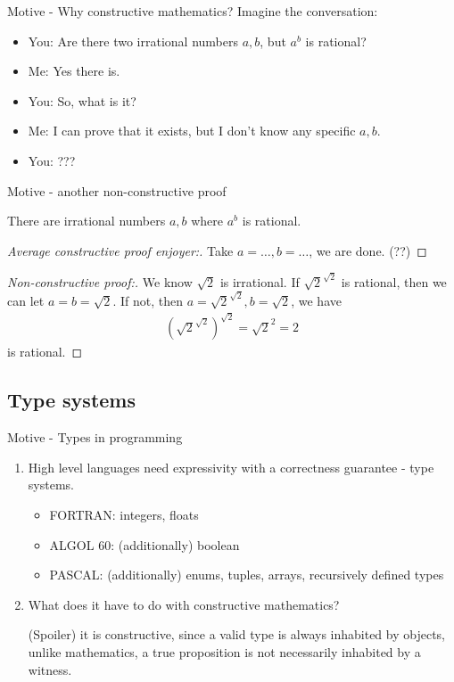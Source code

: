\documentclass{beamer}
\theoremstyle{plain}
\begin{document}
\begin{frame}{Motive - Why constructive mathematics?}
  Imagine the conversation:
  \begin{itemize}
    \pause
    \item You: Are there two irrational numbers $a, b$, but $a^{b}$ is rational?
    \pause
    \item Me: Yes there is.
    \pause
    \item You: So, what is it?
    \pause
    \item Me: I can prove that it exists, but I don't know any specific $a, b$.
    \pause
    \item You: ???
  \end{itemize}
\end{frame}

\begin{frame}{Motive - another non-constructive proof}
  \begin{theorem}
    There are irrational numbers $a,b$ where $a^{b}$ is rational.
  \end{theorem}
  \pause
  \begin{proof}[Average constructive proof enjoyer:]
    Take $a = \ldots, b = \ldots$, we are done. (??)
  \end{proof}
  \pause
  \begin{proof}[Non-constructive proof:]
    We know $\sqrt{2}$ is irrational. If $\sqrt{2}^{\sqrt{2}}$ is rational, then
    we can let $a=b=\sqrt{2}$. If not, then $a=\sqrt{2}^{\sqrt{2}}, b=\sqrt{2}$,
    we have
    \begin{align*}
      (\sqrt{2}^{\sqrt{2}})^{\sqrt{2}} = \sqrt{2}^{2} = 2
    \end{align*}
    is rational.
  \end{proof}
\end{frame}

\subsection{Type systems}
\begin{frame}{Motive - Types in programming}
\begin{enumerate}
\item High level languages need expressivity with a correctness guarantee - type systems.
        \begin{itemize}
          \item FORTRAN: integers, floats
          \item ALGOL 60: (additionally) boolean
          \item PASCAL: (additionally) enums, tuples, arrays, recursively
                defined types
        \end{itemize}
\pause
\item What does it have to do with constructive mathematics?

(Spoiler) it is constructive, since a valid type is always inhabited by objects,
unlike mathematics, a true proposition is not necessarily inhabited by a witness.
\end{enumerate}
\end{frame}
\end{document}
